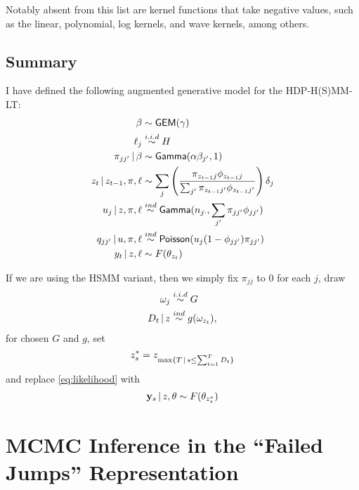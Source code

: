 Notably absent from this list are kernel functions that take negative
values, such as the linear, polynomial, log kernels, and wave kernels, among others.

\subsection{Summary}
\label{sec:model-summary}

I have defined the following augmented generative model for the
HDP-H(S)MM-LT:
\begin{align}
  \label{eq:96} \beta &\sim \mathsf{GEM}(\gamma) \\ \ell_j
&\stackrel{i.i.d}{\sim} H \\ \pi_{jj'} \, \vert \, \beta &\sim \mathsf{Gamma}(\alpha
\beta_{j'},1) \\ z_{t} \, \vert \, z_{t-1}, \pi, \ell &\sim \sum_{j}
\left(\frac{\pi_{z_{t-1}j}\phi_{z_{t-1}j}}{\sum_{j'}
\pi_{z_{t-1}j'}\phi_{z_{t-1}j'}}\right)\delta_j \\ u_j \, \vert \, z, \pi,
\ell &\stackrel{ind}{\sim} \mathsf{Gamma}(n_{j\cdot},\sum_{j'}
\pi_{jj'}\phi_{jj'}) \\ q_{jj'} \, \vert \, u, \pi, \ell
&\stackrel{ind}{\sim} \mathsf{Poisson}(u_j(1 - \phi_{jj'})\pi_{jj'}) \\
  \label{eq:likelihood} y_t \, \vert \, z, \ell &\sim F(\theta_{z_t})
\end{align}

If we are using the HSMM variant, then we simply fix $\pi_{jj}$ to 0
for each $j$, draw
\begin{align}
  \label{eq:97} \omega_j &\stackrel{i.i.d}{\sim} G \\ D_t \, \vert \, z
&\stackrel{ind}{\sim} g(\omega_{z_t}),
\end{align} for chosen $G$ and $g$, set
\begin{equation}
  \label{eq:98} z^*_s = z_{\max\{T \, \vert \, s \leq \sum_{t=1}^T D_t\}}
\end{equation} and replace \eqref{eq:likelihood} with
\begin{equation}
  \label{eq:likelihood-hsmm} \mathbf{y}_s \, \vert \, z, \theta \sim
F(\theta_{z^*_s})
\end{equation}

\section{MCMC Inference in the ``Failed Jumps'' Representation}
\label{sec:inference}


